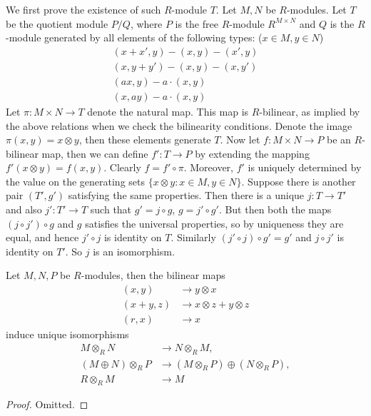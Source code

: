 \medskip\noindent
We first prove the existence of such $R$-module $T$.
Let $M,N$ be $R$-modules. 
Let $T$ be the quotient module
$P/Q$, where $P$ is the free $R$-module $R^{M\times N}$ and $Q$ is the 
$R$-module generated by all elements of
the following types: ($x\in M, y\in N$)
\begin{align}
(x+x',y)-(x,y)-(x',y)\\
(x,y+y')-(x,y)-(x,y')\\
(ax,y)-a\cdot(x,y)\\
(x,ay)-a\cdot(x,y)
\end{align}
Let $\pi:M\times N\rightarrow T$ denote the natural map.
This map is $R$-bilinear, as 
implied by the above relations
when we check the bilinearity conditions. Denote the image
$\pi(x,y)=x\otimes 
y$, then these elements generate
$T$. Now let $f:M\times N\rightarrow P$ be an $R$-bilinear map,
then we can define 
$f':T\rightarrow P$ by extending the mapping
$f'(x\otimes y)=f(x,y)$. Clearly $f=f'\circ \pi$. Moreover, $f'$ is uniquely 
determined by the value on the
generating sets $\{x\otimes y:x\in M, y\in N\}$.
Suppose there is another pair $(T',g')$ satisfying the same properties.
Then there is a unique $j:T\rightarrow T'$ and
also $j':T'\rightarrow T$ such that $g'=j\circ g$, $g=j'\circ g'$.
But then both the maps $(j\circ j') \circ g$ and $g$
satisfies the universal properties, so by uniqueness they are equal,
and hence $j'\circ j$ is identity on $T$.
Similarly $(j'\circ j) \circ g'=g'$ and $j\circ j'$ is identity on $T'$.
So $j$ is an isomorphism.

\begin{lemma}
\label{lemma-flip-tensor-product}
Let $M,N,P$ be $R$-modules, then the bilinear maps \\
\begin{align}
(x,y) &\rightarrow y\otimes x\\
(x+y,z) &\rightarrow x\otimes z+y\otimes z\\
(r,x) &\rightarrow x
\end{align}
induce unique isomorphisms
\begin{align}
M\otimes_R N &\rightarrow N\otimes_R M, \\
(M\oplus N)\otimes_R P &\rightarrow (M\otimes_R P)\oplus(N\otimes_R P),  \\
R\otimes_R M &\rightarrow M
\end{align}
\end{lemma}

\begin{proof}
Omitted.
\end{proof}

